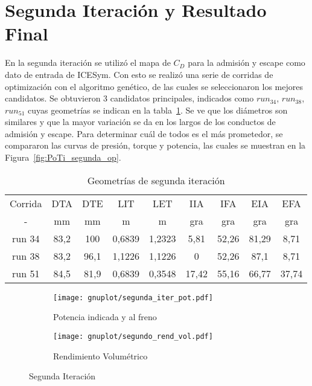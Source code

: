 \section{Segunda Iteración y Resultado Final}
%
En la segunda iteración se utilizó el mapa de $C_D$ para la admisión y escape
como dato de entrada de ICESym.
%
Con esto se realizó una serie de corridas de
optimización con el algoritmo genético, de las cuales se seleccionaron los
mejores candidatos.
%
Se obtuvieron 3 candidatos principales, indicados como \emph{$run_{34}$},
\emph{$run_{38}$}, \emph{$run_{51}$} cuyas geometrías se indican en la
tabla~\ref{tab:2iter_geom}.
%
Se ve que los diámetros son similares y que la mayor variación se da en los
largos de los conductos de admisión y escape.
%
%
Para determinar cuál de todos es el más prometedor, se compararon las curvas de
presión, torque y potencia, las cuales se muestran en la
Figura~\ref{fig:PoTi_segunda_op}.

\begin{table}
\centering
\begin{tabular}{ccccccccc} \toprule
  Corrida & DTA  & DTE  & LIT    & LET    & IIA   & IFA   & EIA   & EFA \\
  -       & mm   & mm   & m      & m      & gra   & gra   & gra   & gra \\ \midrule
  run 34  & 83,2 & 100  & 0,6839 & 1,2323 & 5,81  & 52,26 & 81,29 & 8,71 \\
  run 38  & 83,2 & 96,1 & 1,1226 & 1,1226 & 0     & 52,26 & 87,1  & 8,71 \\
  run 51  & 84,5 & 81,9 & 0,6839 & 0,3548 & 17,42 & 55,16 & 66,77 & 37,74 \\\bottomrule
\end{tabular}
\caption{Geometrías de segunda iteración}\label{tab:2iter_geom}
\end{table}

\begin{figure}[ht]
  \centering
  \begin{subfigure}[b]{.5\textwidth}
    \centering
    \texttt{[image: gnuplot/segunda\_iter\_pot.pdf]}
    \caption{Potencia indicada y al freno} \label{fig:primer_op}
  \end{subfigure}%
  \begin{subfigure}[b]{.5\textwidth}
    \centering
    \texttt{[image: gnuplot/segundo\_rend\_vol.pdf]}
    \caption{Rendimiento Volumétrico}
  \end{subfigure}
    \caption{Segunda Iteración} \label{fig:primer_op}
\end{figure}


